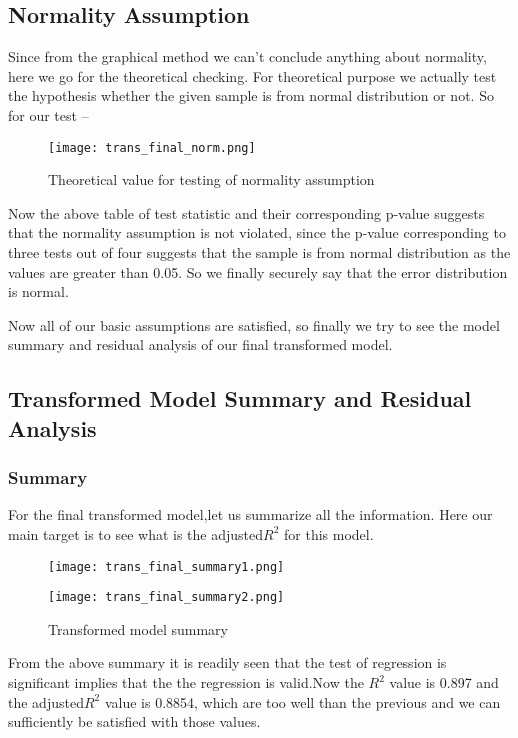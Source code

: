 \documentclass[A4paper,11pt]{report}
\begin{document}
	 \subsection{Normality Assumption}
	 Since from the graphical method we can't conclude anything about normality, here we go for the theoretical checking. For theoretical purpose we actually test the hypothesis whether the given sample is from normal distribution or not. So for our test --
	 \begin{figure}[H]
	 	\texttt{[image: trans\_final\_norm.png]}
	 	\caption{Theoretical value for testing of normality assumption}
	 \end{figure}
	 Now the above table of test statistic and their corresponding p-value suggests that the normality assumption is not violated, since the p-value corresponding to three tests out of four suggests that the sample is from normal distribution as the values are greater than 0.05. So we finally securely say that the error distribution is normal.\\
	\par Now all of our basic assumptions are satisfied, so finally we try to see the model summary and residual analysis of our final transformed model.
	\subsection{Transformed Model Summary and Residual Analysis}
	\subsubsection{Summary}
	 For the final transformed model,let us summarize all the information. Here our main target is to see what is the adjusted$R^2$ for this model. 
	 \begin{figure}[H]
	 	\texttt{[image: trans\_final\_summary1.png]}
	 \end{figure}
	 \begin{figure}[H]
	 	\texttt{[image: trans\_final\_summary2.png]}
	 	\caption{Transformed model summary}
	 \end{figure}
	 From the above summary it is readily seen that the test of regression is significant implies that the the regression is valid.Now the $R^2$ value is 0.897 and the adjusted$R^2$ value is 0.8854, which are too well than the previous and we can sufficiently be satisfied with those values.
\end{document}
